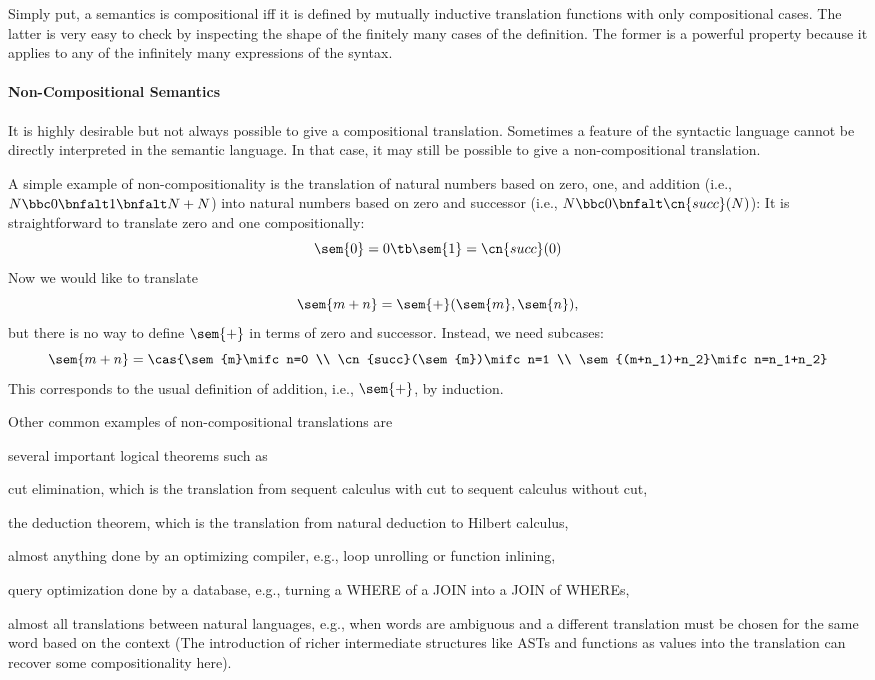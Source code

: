 Simply put, a semantics is compositional iff it is defined by mutually inductive translation functions with only compositional cases.
The latter is very easy to check by inspecting the shape of the finitely many cases of the definition.
The former is a powerful property because it applies to any of the infinitely many expressions of the syntax.

\paragraph{Non-Compositional Semantics}

It is highly desirable but not always possible to give a compositional translation.
Sometimes a feature of the syntactic language cannot be directly interpreted in the semantic language.
In that case, it may still be possible to give a non-compositional translation.

\begin{example}
A simple example of non-compositionality is the translation of natural numbers based on zero, one, and addition (i.e., $N\bbc 0\bnfalt 1\bnfalt N+N$) into natural numbers based on zero and successor (i.e., $N\bbc 0\bnfalt\cn{succ}(N)$):
It is straightforward to translate zero and one compositionally:
\[\sem{0}=0 \tb\sem{1}=\cn{succ}(0)\]
Now we would like to translate \[\sem{m+n}=\sem{+}(\sem{m},\sem{n}),\] but there is no way to define $\sem{+}$ in terms of zero and successor.
Instead, we need subcases:
\[\sem{m+n}=\cas{\sem{m}\mifc n=0 \\ \cn{succ}(\sem{m})\mifc n=1 \\ \sem{(m+n_1)+n_2}\mifc n=n_1+n_2}\]
This corresponds to the usual definition of addition, i.e., $\sem{+}$, by induction.
\end{example}

Other common examples of non-compositional translations are
\begin{compactitem}
 \item several important logical theorems such as
  \begin{compactitem}
   \item cut elimination, which is the translation from sequent calculus with cut to sequent calculus without cut,
   \item the deduction theorem, which is the translation from natural deduction to Hilbert calculus,
  \end{compactitem}
 \item almost anything done by an optimizing compiler, e.g., loop unrolling or function inlining,
 \item query optimization done by a database, e.g., turning a WHERE of a JOIN into a JOIN of WHEREs,
 \item almost all translations between natural languages, e.g., when words are ambiguous and a different translation must be chosen for the same word based on the context (The introduction of richer intermediate structures like ASTs and functions as values into the translation can recover some compositionality here).
\end{compactitem}

